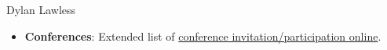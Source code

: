 \documentclass[11pt,a4paper]{article}
\begin{document}
\begin{cv}{Dylan Lawless}
\begin{itemize}[leftmargin=*]
\item \textbf{Conferences}: Extended list of \href{https://lawlessgenomics.com/resume/}{conference invitation/participation online}.


\end{itemize}
\end{cv}
\end{document}
